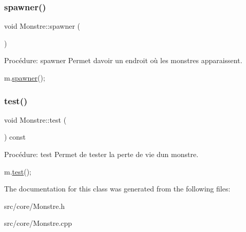 \subsubsection{\texorpdfstring{spawner()}{spawner()}}
{\footnotesize\ttfamily void Monstre\+::spawner (\begin{DoxyParamCaption}{ }\end{DoxyParamCaption})}



Procédure\+: spawner Permet d\textquotesingle{}avoir un endroit où les monstres apparaissent. 


\begin{DoxyCode}
m.\hyperlink{classMonstre_a26db17b29af1a99278e7d21bc91f1532}{spawner}();
\end{DoxyCode}
 \mbox{\label{classMonstre_a82b15e169ab7a45dc9dc229256f89029}} 
\subsubsection{\texorpdfstring{test()}{test()}}
{\footnotesize\ttfamily void Monstre\+::test (\begin{DoxyParamCaption}{ }\end{DoxyParamCaption}) const}



Procédure\+: test Permet de tester la perte de vie d\textquotesingle{}un monstre. 


\begin{DoxyCode}
m.\hyperlink{classMonstre_a82b15e169ab7a45dc9dc229256f89029}{test}();
\end{DoxyCode}
 

The documentation for this class was generated from the following files\+:\begin{DoxyCompactItemize}
\item 
src/core/Monstre.\+h\item 
src/core/Monstre.\+cpp\end{DoxyCompactItemize}
